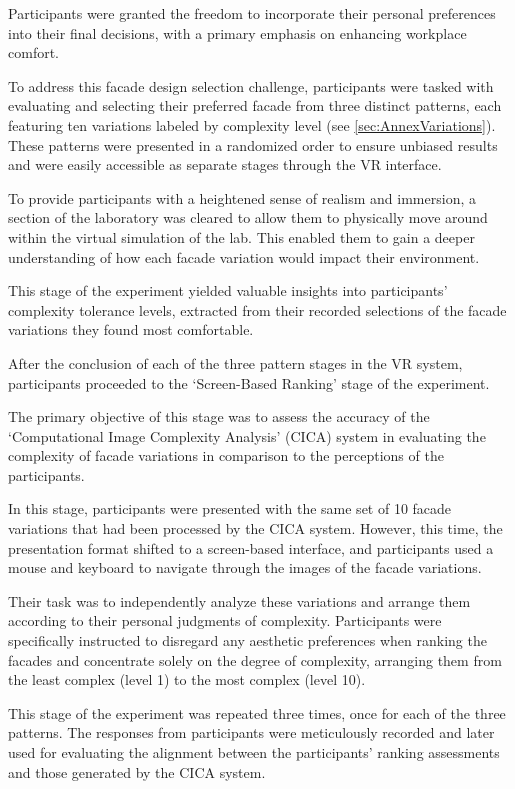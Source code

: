 Participants were granted the freedom to incorporate their personal preferences into their final decisions, with a primary emphasis on enhancing workplace comfort.

To address this facade design selection challenge, participants were tasked with evaluating and selecting their preferred facade from three distinct patterns, each featuring ten variations labeled by complexity level (see \ref{sec:AnnexVariations}).
These patterns were presented in a randomized order to ensure unbiased results and were easily accessible as separate stages through the VR interface.

To provide participants with a heightened sense of realism and immersion, a section of the laboratory was cleared to allow them to physically move around within the virtual simulation of the lab.
This enabled them to gain a deeper understanding of how each facade variation would impact their environment.

This stage of the experiment yielded valuable insights into participants' complexity tolerance levels, extracted from their recorded selections of the facade variations they found most comfortable.



After the conclusion of each of the three pattern stages in the VR system, participants proceeded to the `Screen-Based Ranking' stage of the experiment.

The primary objective of this stage was to assess the accuracy of the `Computational Image Complexity Analysis' (CICA) system in evaluating the complexity of facade variations in comparison to the perceptions of the participants.

In this stage, participants were presented with the same set of 10 facade variations that had been processed by the CICA system.
However, this time, the presentation format shifted to a screen-based interface, and participants used a mouse and keyboard to navigate through the images of the facade variations.

Their task was to independently analyze these variations and arrange them according to their personal judgments of complexity.
Participants were specifically instructed to disregard any aesthetic preferences when ranking the facades and concentrate solely on the degree of complexity, arranging them from the least complex (level 1) to the most complex (level 10).

This stage of the experiment was repeated three times, once for each of the three patterns.
The responses from participants were meticulously recorded and later used for evaluating the alignment between the participants' ranking assessments and those generated by the CICA system.

